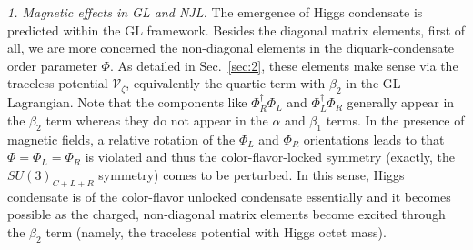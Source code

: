 \documentclass[12pt]{article}
\begin{document}
\emph{1. Magnetic effects in GL and NJL.} 
The emergence of Higgs condensate is predicted within the GL framework. 
Besides the diagonal matrix elements, first of all, we are more concerned the non-diagonal elements in the diquark-condensate order parameter $\Phi$.
As detailed in Sec.~\ref{sec:2}, these elements make sense via the traceless potential $\mathcal{V}_\zeta$, equivalently the quartic term with $\beta_2$ in the GL Lagrangian.
Note that the components like $\Phi_R^\dagger\Phi_L$ and $\Phi_L^\dagger\Phi_R$ generally appear in the $\beta_2$ term whereas
they do not appear in the $\alpha$ and $\beta_1$ terms.
In the presence of magnetic fields, a relative rotation of the $\Phi_L$ and $\Phi_R$ orientations leads to that $\Phi=\Phi_L=\Phi_R$
is violated and thus the color-flavor-locked symmetry (exactly, the $SU (3)_{C+L+R}$ symmetry) comes to be perturbed.
In this sense, Higgs condensate is of the color-flavor unlocked condensate essentially
and it becomes possible as the charged, non-diagonal matrix elements become excited 
through the $\beta_2$ term (namely, the traceless potential with Higgs octet mass).
 
\end{document}

